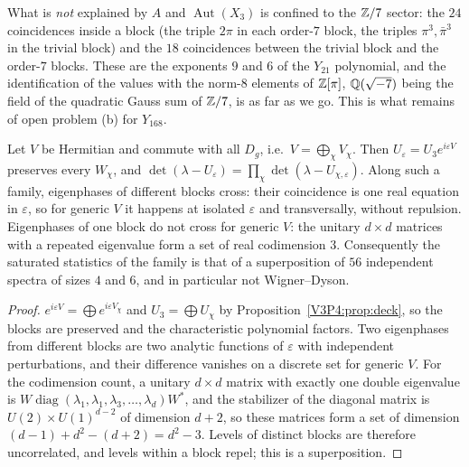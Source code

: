 What is \emph{not} explained by $A$ and $\operatorname{Aut}(X_3)$ is confined to the $\mathbb{Z}/7$
sector: the $24$ coincidences inside a block (the triple $2\pi$ in each order-$7$ block, the
triples $\pi^{3},\bar\pi^{3}$ in the trivial block) and the $18$ coincidences between the trivial
block and the order-$7$ blocks. These are the exponents $9$ and $6$ of the $Y_{21}$ polynomial,
and the identification of the values with the norm-$8$ elements of $\mathbb{Z}[\pi]$, $\mathbb{Q}(\sqrt{-7})$
being the field of the quadratic Gauss sum of $\mathbb{Z}/7$, is as far as we go. This is what remains of
open problem (b) for $Y_{168}$.

\begin{proposition}\label{V3P4:prop:equiv}
Let $V$ be Hermitian and commute with all $D_g$, i.e.\ $V=\bigoplus_\chi V_\chi$. Then
$U_\varepsilon=U_3e^{i\varepsilon V}$ preserves every $W_\chi$, and
$\det(\lambda-U_\varepsilon)=\prod_\chi\det(\lambda-U_{\chi,\varepsilon})$. Along such a family,
eigenphases of different blocks cross: their coincidence is one real equation in $\varepsilon$,
so for generic $V$ it happens at isolated $\varepsilon$ and transversally, without repulsion.
Eigenphases of one block do not cross for generic $V$: the unitary $d\times d$ matrices with a
repeated eigenvalue form a set of real codimension $3$. Consequently the saturated statistics of
the family is that of a superposition of $56$ independent spectra of sizes $4$ and $6$, and in
particular not Wigner--Dyson.
\end{proposition}

\begin{proof}
$e^{i\varepsilon V}=\bigoplus e^{i\varepsilon V_\chi}$ and $U_3=\bigoplus U_\chi$ by
Proposition~\ref{V3P4:prop:deck}, so the blocks are preserved and the characteristic polynomial
factors. Two eigenphases from different blocks are two analytic functions of $\varepsilon$ with
independent perturbations, and their difference vanishes on a discrete set for generic $V$. For
the codimension count, a unitary $d\times d$ matrix with exactly one double eigenvalue is
$W\operatorname{diag}(\lambda_1,\lambda_1,\lambda_3,\dots,\lambda_d)W^{*}$, and the stabilizer of
the diagonal matrix is $U(2)\times U(1)^{d-2}$ of dimension $d+2$, so these matrices form a set of
dimension $(d-1)+d^{2}-(d+2)=d^{2}-3$. Levels of distinct blocks are therefore uncorrelated, and
levels within a block repel; this is a superposition.
\end{proof}

